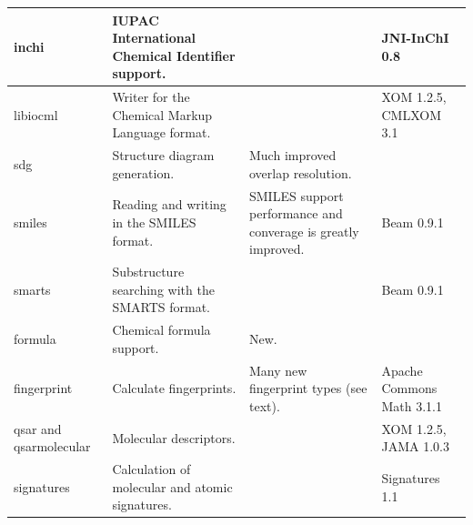 \documentclass[10pt]{bmcart}
\begin{document}
\begin{backmatter}
\begin{minipage}{1\textwidth}
\begin{tabular}{lp{3cm}p{3cm}l}
  inchi                      & IUPAC International Chemical Identifier support. & & JNI-InChI 0.8~\cite{Spjuth2013}  \\ \hline
  libiocml                   & Writer for the Chemical Markup Language format. & & XOM 1.2.5, CMLXOM 3.1~\cite{Murray-Rust2011} \\ \hline
  sdg                        & Structure diagram generation.  & Much improved overlap resolution. & \\ \hline
  smiles                     & Reading and writing in the SMILES format. & SMILES support performance and converage is greatly improved. & Beam 0.9.1~\cite{Beam} \\ \hline
  smarts                     & Substructure searching with the SMARTS format. & & Beam 0.9.1~\cite{Beam} \\ \hline
  formula                    & Chemical formula support. & New. & \\ \hline
  fingerprint                & Calculate fingerprints. & Many new fingerprint types (see text). & Apache Commons Math 3.1.1 \\ \hline
  qsar and qsarmolecular                       & Molecular descriptors.  & & XOM 1.2.5, JAMA 1.0.3~\cite{Hicklin2012} \\ \hline
  signatures                 & Calculation of molecular and atomic signatures. & & Signatures 1.1 \\ \hline %
    \end{tabular}
    \end{minipage}


\end{backmatter}
\end{document}
